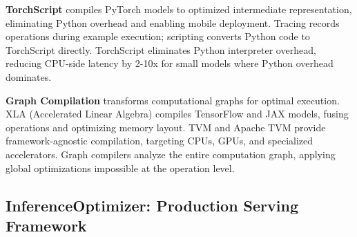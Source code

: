 \textbf{TorchScript} compiles PyTorch models to optimized intermediate representation, eliminating Python overhead and enabling mobile deployment. Tracing records operations during example execution; scripting converts Python code to TorchScript directly. TorchScript eliminates Python interpreter overhead, reducing CPU-side latency by 2-10x for small models where Python overhead dominates.

\textbf{Graph Compilation} transforms computational graphs for optimal execution. XLA (Accelerated Linear Algebra) compiles TensorFlow and JAX models, fusing operations and optimizing memory layout. TVM and Apache TVM provide framework-agnostic compilation, targeting CPUs, GPUs, and specialized accelerators. Graph compilers analyze the entire computation graph, applying global optimizations impossible at the operation level.

\subsection{InferenceOptimizer: Production Serving Framework}

